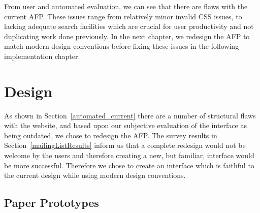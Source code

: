\documentclass[bsc,frontabs,oneside,singlespacing,parskip,deptreport,logo]{infthesis}
\begin{document}
From user and automated evaluation, we can see that there are flaws with the current AFP. These issues range from relatively minor invalid CSS issues, to lacking adequate search facilities which are crucial for user productivity and not duplicating work done previously. In the next chapter, we redesign the AFP to match modern design conventions before fixing these issues in the following implementation chapter.



\chapter{Design} \label{design}


As shown in Section~\ref{automated_current} there are a number of structural flaws with the website, and based upon our subjective evaluation of the interface as being outdated, we chose to redesign the AFP. The survey results in Section~\ref{mailingListResults} inform us that a complete redesign would not be welcome by the users and therefore creating a new, but familiar, interface would be more successful. Therefore we chose to create an interface which is faithful to the current design while using modern design conventions.





\section{Paper Prototypes} \label{paperPrototypes}
\end{document}
